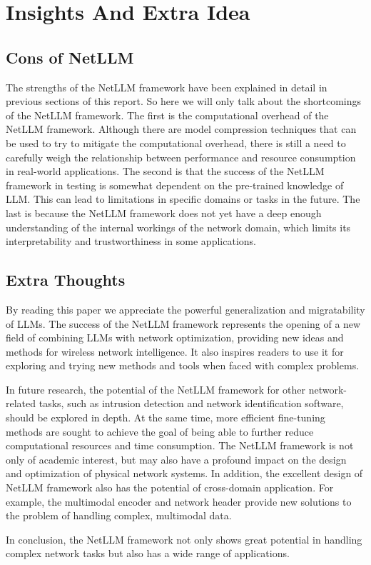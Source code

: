 \documentclass[twocolumn]{article}
\begin{document}
\section{Insights And Extra Idea}

\subsection{Cons of NetLLM}
The strengths of the NetLLM framework have been explained in detail in previous sections of this report. So here we will only talk about the shortcomings of the NetLLM framework. The first is the computational overhead of the NetLLM framework. Although there are model compression techniques that can be used to try to mitigate the computational overhead, there is still a need to carefully weigh the relationship between performance and resource consumption in real-world applications. The second is that the success of the NetLLM framework in testing is somewhat dependent on the pre-trained knowledge of LLM. This can lead to limitations in specific domains or tasks in the future. The last is because the NetLLM framework does not yet have a deep enough understanding of the internal workings of the network domain, which limits its interpretability and trustworthiness in some applications.

\subsection{Extra Thoughts}
By reading this paper we appreciate the powerful generalization and migratability of LLMs. The success of the NetLLM framework represents the opening of a new field of combining LLMs with network optimization, providing new ideas and methods for wireless network intelligence. It also inspires readers to use it for exploring and trying new methods and tools when faced with complex problems.

In future research, the potential of the NetLLM framework for other network-related tasks, such as intrusion detection and network identification software, should be explored in depth. At the same time, more efficient fine-tuning methods are sought to achieve the goal of being able to further reduce computational resources and time consumption. The NetLLM framework is not only of academic interest, but may also have a profound impact on the design and optimization of physical network systems. In addition, the excellent design of NetLLM framework also has the potential of cross-domain application. For example, the multimodal encoder and network header provide new solutions to the problem of handling complex, multimodal data.

In conclusion, the NetLLM framework not only shows great potential in handling complex network tasks but also has a wide range of applications.
\end{document}
